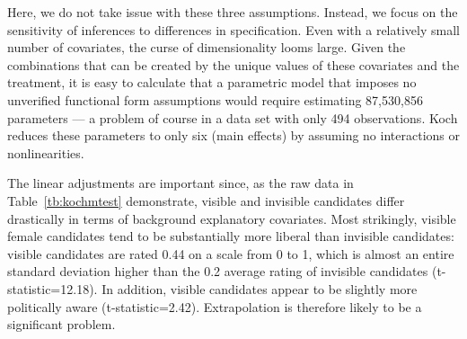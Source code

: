 \documentclass[11pt,titlepage]{article}
\begin{document}
Here, we do not take issue with these three assumptions.  Instead, we
focus on the sensitivity of inferences to differences in specification.
Even with a relatively small number of covariates, the curse of
dimensionality looms large.  Given the combinations that can be
created by the unique values of these covariates and the treatment, it
is easy to calculate that a parametric model that imposes no
unverified functional form assumptions would require estimating
87,530,856 parameters --- a problem of course in a data set with only
494 observations.  Koch reduces these parameters to only six (main
effects) by assuming no interactions or nonlinearities.

The linear adjustments are important since, as the raw data in
Table~\ref{tb:kochmtest} demonstrate, visible and invisible candidates
differ drastically in terms of background explanatory covariates.
Most strikingly, visible female candidates tend to be substantially
more liberal than invisible candidates: visible candidates are rated
0.44 on a scale from 0 to 1, which is almost an entire standard
deviation higher than the 0.2 average rating of invisible candidates
(t-statistic=12.18).  In addition, visible candidates appear to be
slightly more politically aware (t-statistic=2.42).  Extrapolation is
therefore likely to be a significant problem.
\end{document}
